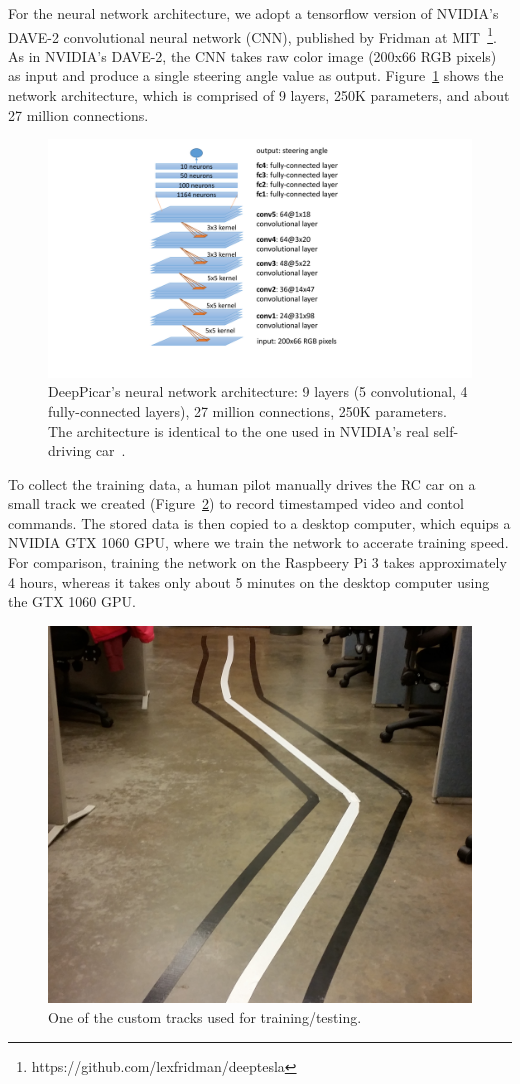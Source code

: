 For the neural network architecture, we adopt a tensorflow version of
NVIDIA's DAVE-2 convolutional neural network (CNN), published by
Fridman at  MIT~\footnote{https://github.com/lexfridman/deeptesla}. As
in NVIDIA's DAVE-2, the CNN takes raw color image (200x66 RGB pixels)
as input and produce a single steering angle value as
output. Figure~\ref{fig:architecture} shows the network architecture, which
is comprised of 9 layers, 250K parameters, and about 27 million
connections.

\begin{figure}[t]
  \centering
  \includegraphics[width=.4\textwidth]{figs/architecture}
  \caption{DeepPicar's neural network architecture: 9 layers (5
    convolutional, 4 fully-connected layers), 27 million connections,
    250K parameters. The architecture is identical to the one used
    in NVIDIA's real self-driving car~\cite{Bojarski2016}.}
  \label{fig:architecture}
\end{figure}

To collect the training data, a human pilot manually drives the RC car
on a small track we created (Figure~\ref{fig:track}) to record
timestamped video and contol commands. The stored data is then copied 
to a desktop computer, which equips a NVIDIA GTX 1060 GPU, where we
train the network to accerate training speed. 
For comparison, training the network on the Raspbeery Pi 3 takes
approximately 4 hours, whereas it takes only about 5 minutes on the
desktop computer using the GTX 1060 GPU.

\begin{figure}[t]
  \centering
  \includegraphics[width=.4\textwidth]{figs/track_new2}
  \caption{One of the custom tracks used for training/testing.}
  \label{fig:track}
\end{figure}



